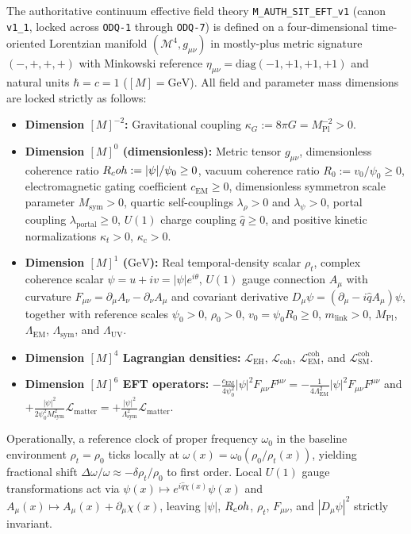 The authoritative continuum effective field theory \texttt{M\_AUTH\_SIT\_EFT\_v1} (canon \texttt{v1\_1}, locked across \texttt{ODQ-1} through \texttt{ODQ-7}) is defined on a four-dimensional time-oriented Lorentzian manifold $(\mathcal{M}^4, g_{\mu\nu})$ in mostly-plus metric signature $(-,+,+,+)$ with Minkowski reference $\eta_{\mu\nu} = \mathrm{diag}(-1,+1,+1,+1)$ and natural units $\hbar = c = 1$ ($[M] = \mathrm{GeV}$). All field and parameter mass dimensions are locked strictly as follows:
\begin{itemize}
  \item \textbf{Dimension $[M]^{-2}$:} Gravitational coupling $\kappa_G := 8\pi G = M_{\mathrm{Pl}}^{-2} > 0$.
  \item \textbf{Dimension $[M]^0$ (dimensionless):} Metric tensor $g_{\mu\nu}$, dimensionless coherence ratio $R_coh := |\psi|/\psi_0 \ge 0$, vacuum coherence ratio $R_0 := v_0/\psi_0 \ge 0$, electromagnetic gating coefficient $c_{\mathrm{EM}} \ge 0$, dimensionless symmetron scale parameter $M_{\mathrm{sym}} > 0$, quartic self-couplings $\lambda_\rho > 0$ and $\lambda_\psi > 0$, portal coupling $\lambda_{\mathrm{portal}} \ge 0$, $U(1)$ charge coupling $\hat{q} \ge 0$, and positive kinetic normalizations $\kappa_t > 0$, $\kappa_c > 0$.
  \item \textbf{Dimension $[M]^1$ ($\mathrm{GeV}$):} Real temporal-density scalar $\rho_t$, complex coherence scalar $\psi = u + iv = |\psi|e^{i\theta}$, $U(1)$ gauge connection $A_\mu$ with curvature $F_{\mu\nu} = \partial_\mu A_\nu - \partial_\nu A_\mu$ and covariant derivative $D_\mu\psi = (\partial_\mu - i\hat{q}A_\mu)\psi$, together with reference scales $\psi_0 > 0$, $\rho_0 > 0$, $v_0 = \psi_0 R_0 \ge 0$, $m_{\mathrm{link}} > 0$, $M_{\mathrm{Pl}}$, $\Lambda_{\mathrm{EM}}$, $\Lambda_{\mathrm{sym}}$, and $\Lambda_{\mathrm{UV}}$.
  \item \textbf{Dimension $[M]^4$ Lagrangian densities:} $\mathcal{L}_{\mathrm{EH}}$, $\mathcal{L}_{\mathrm{coh}}$, $\mathcal{L}_{\mathrm{EM}}^{\mathrm{coh}}$, and $\mathcal{L}_{\mathrm{SM}}^{\mathrm{coh}}$.
  \item \textbf{Dimension $[M]^6$ EFT operators:} $-\frac{c_{\mathrm{EM}}}{4\psi_0^2}|\psi|^2 F_{\mu\nu}F^{\mu\nu} = -\frac{1}{4\Lambda_{\mathrm{EM}}^2}|\psi|^2 F_{\mu\nu}F^{\mu\nu}$ and $+\frac{|\psi|^2}{2\psi_0^2 M_{\mathrm{sym}}^2}\mathcal{L}_{\mathrm{matter}} = +\frac{|\psi|^2}{\Lambda_{\mathrm{sym}}^2}\mathcal{L}_{\mathrm{matter}}$.
\end{itemize}

Operationally, a reference clock of proper frequency $\omega_0$ in the baseline environment $\rho_t = \rho_0$ ticks locally at $\omega(x) = \omega_0(\rho_0/\rho_t(x))$, yielding fractional shift $\Delta\omega/\omega \approx -\delta\rho_t/\rho_0$ to first order. Local $U(1)$ gauge transformations act via $\psi(x) \mapsto e^{i\hat{q}\chi(x)}\psi(x)$ and $A_\mu(x) \mapsto A_\mu(x) + \partial_\mu\chi(x)$, leaving $|\psi|$, $R_coh$, $\rho_t$, $F_{\mu\nu}$, and $|D_\mu\psi|^2$ strictly invariant.

